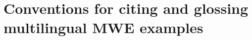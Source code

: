 \documentclass[output=paper,
modfonts,
]{langscibook}
\begin{document}







\section{Conventions for citing and glossing multilingual MWE examples}
\end{document}
